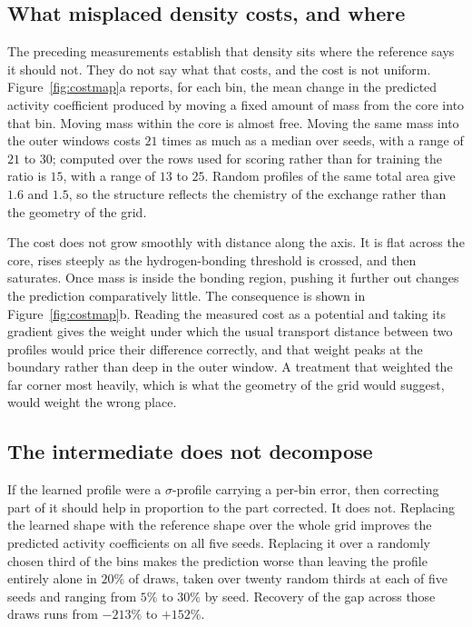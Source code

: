 \subsection{What misplaced density costs, and where}
\label{sec:cost}

The preceding measurements establish that density sits where the reference says it should not. They
do not say what that costs, and the cost is not uniform. Figure~\ref{fig:costmap}a reports, for
each bin, the mean change in the predicted activity coefficient produced by moving a fixed amount
of mass from the core into that bin. Moving mass within the core is almost free. Moving the same
mass into the outer windows costs $21$ times as much as a median over seeds, with a range of $21$
to $30$; computed over the rows used for scoring rather than for training the ratio is $15$, with a
range of $13$ to $25$. Random profiles of the same total area give $1.6$ and $1.5$, so the
structure reflects the chemistry of the exchange rather than the geometry of the grid.

The cost does not grow smoothly with distance along the axis. It is flat across the core, rises
steeply as the hydrogen-bonding threshold is crossed, and then saturates. Once mass is inside the
bonding region, pushing it further out changes the prediction comparatively little. The consequence
is shown in Figure~\ref{fig:costmap}b. Reading the measured cost as a potential and taking its
gradient gives the weight under which the usual transport distance between two profiles would price
their difference correctly, and that weight peaks at the boundary rather than deep in the outer
window. A treatment that weighted the far corner most heavily, which is what the geometry of the
grid would suggest, would weight the wrong place.

\subsection{The intermediate does not decompose}
\label{sec:nonadditive}

If the learned profile were a $\sigma$-profile carrying a per-bin error, then correcting part of it
should help in proportion to the part corrected. It does not. Replacing the learned shape with the
reference shape over the whole grid improves the predicted activity coefficients on all five seeds.
Replacing it over a randomly chosen third of the bins makes the prediction worse than leaving the
profile entirely alone in $20\%$ of draws, taken over twenty random thirds at each of five seeds and
ranging from $5\%$ to $30\%$ by seed. Recovery of the gap across those draws runs from $-213\%$ to
$+152\%$.

